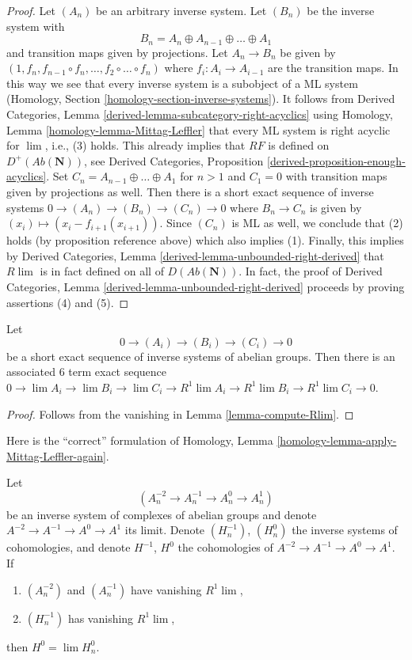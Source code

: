 \begin{proof}
Let $(A_n)$ be an arbitrary inverse system. Let $(B_n)$ be the inverse
system with
$$
B_n = A_n \oplus A_{n - 1} \oplus \ldots \oplus A_1
$$
and transition maps given by projections. Let $A_n \to B_n$ be given
by $(1, f_n, f_{n - 1} \circ f_n, \ldots, f_2 \circ \ldots \circ f_n)$
where $f_i : A_i \to A_{i - 1}$ are the transition maps.
In this way we see that every inverse system is a subobject of a
ML system (Homology, Section \ref{homology-section-inverse-systems}).
It follows from
Derived Categories, Lemma \ref{derived-lemma-subcategory-right-acyclics}
using Homology, Lemma \ref{homology-lemma-Mittag-Leffler}
that every ML system is right acyclic for $\lim$, i.e., (3) holds.
This already implies that $RF$ is defined on $D^+(\textit{Ab}(\mathbf{N}))$,
see Derived Categories, Proposition \ref{derived-proposition-enough-acyclics}.
Set $C_n = A_{n - 1} \oplus \ldots \oplus A_1$ for $n > 1$ and
$C_1 = 0$ with transition maps given by projections as well.
Then there is a short exact sequence of inverse systems
$0 \to (A_n) \to (B_n) \to (C_n) \to 0$ where $B_n \to C_n$
is given by $(x_i) \mapsto (x_i - f_{i + 1}(x_{i + 1}))$.
Since $(C_n)$ is ML as well, we conclude that (2) holds
(by proposition reference above) which also implies (1).
Finally, this implies by Derived Categories, Lemma
\ref{derived-lemma-unbounded-right-derived}
that $R\lim$ is in fact defined on all of $D(\textit{Ab}(\mathbf{N}))$.
In fact, the proof of Derived Categories, Lemma
\ref{derived-lemma-unbounded-right-derived}
proceeds by proving assertions (4) and (5).
\end{proof}

\begin{lemma}
\label{lemma-six-term-Rlim}
Let
$$
0 \to (A_i) \to (B_i) \to (C_i) \to 0
$$
be a short exact sequence of inverse systems of abelian groups.
Then there is an associated $6$ term exact sequence
$0 \to \lim A_i \to \lim B_i \to \lim C_i \to
R^1\lim A_i \to R^1\lim B_i \to R^1\lim C_i \to 0$.
\end{lemma}

\begin{proof}
Follows from the vanishing in Lemma \ref{lemma-compute-Rlim}.
\end{proof}

\noindent
Here is the ``correct'' formulation of
Homology, Lemma \ref{homology-lemma-apply-Mittag-Leffler-again}.

\begin{lemma}
\label{lemma-apply-Mittag-Leffler-again}
Let
$$
(A^{-2}_n \to A^{-1}_n \to A^0_n \to A^1_n)
$$
be an inverse system of complexes of abelian groups and denote
$A^{-2} \to A^{-1} \to A^0 \to A^1$ its limit. Denote
$(H_n^{-1})$, $(H_n^0)$ the inverse systems of cohomologies, and
denote $H^{-1}$, $H^0$ the cohomologies of $A^{-2} \to A^{-1} \to A^0 \to A^1$.
If
\begin{enumerate}
\item $(A^{-2}_n)$ and $(A^{-1}_n)$ have vanishing $R^1\lim$,
\item $(H^{-1}_n)$ has vanishing $R^1\lim$,
\end{enumerate}
then $H^0 = \lim H_n^0$.
\end{lemma}

